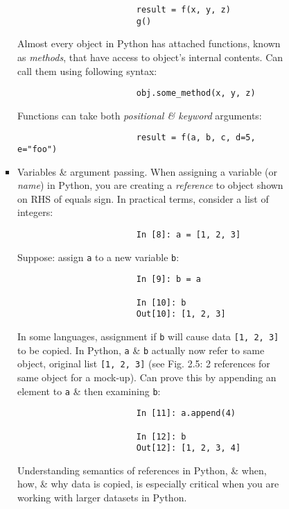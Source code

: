 \documentclass{article}
\begin{document}
\begin{enumerate}
\begin{itemize}
\begin{itemize}
\begin{itemize}
\begin{itemize}
					\begin{verbatim}
						result = f(x, y, z)
						g()
					\end{verbatim}
					Almost every object in Python has attached functions, known as {\it methods}, that have access to object's internal contents. Can call them using following syntax:
					\begin{verbatim}
						obj.some_method(x, y, z)
					\end{verbatim}
					Functions can take both {\it positional \& keyword} arguments:
					\begin{verbatim}
						result = f(a, b, c, d=5, e="foo")
					\end{verbatim}
					\item {\sf Variables \& argument passing.} When assigning a variable (or {\it name}) in Python, you are creating a {\it reference} to object shown on RHS of equals sign. In practical terms, consider a list of integers:
					\begin{verbatim}
						In [8]: a = [1, 2, 3]
					\end{verbatim}
					Suppose: assign {\tt a} to a new variable {\tt b}:
					\begin{verbatim}
						In [9]: b = a
						
						In [10]: b
						Out[10]: [1, 2, 3]
					\end{verbatim}
					In some languages, assignment if {\tt b} will cause data {\tt[1, 2, 3]} to be copied. In Python, {\tt a} \& {\tt b} actually now refer to same object, original list {\tt[1, 2, 3]} (see {\sf Fig. 2.5: 2 references for same object} for a mock-up). Can prove this by appending an element to {\tt a} \& then examining {\tt b}:
					\begin{verbatim}
						In [11]: a.append(4)
						
						In [12]: b
						Out[12]: [1, 2, 3, 4]
					\end{verbatim}
					Understanding semantics of references in Python, \& when, how, \& why data is copied, is especially critical when you are working with larger datasets in Python.
					

\end{itemize}
\end{itemize}
\end{itemize}
\end{itemize}
\end{enumerate}
\end{document}

